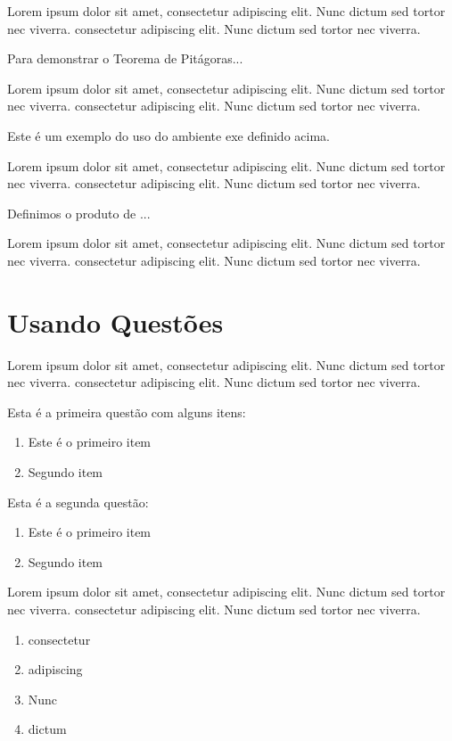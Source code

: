 Lorem ipsum dolor sit amet, consectetur adipiscing elit. Nunc dictum sed tortor nec viverra. consectetur adipiscing elit. Nunc dictum sed tortor nec viverra.

\begin{prop}
	Para demonstrar o Teorema de Pitágoras...
\end{prop}

Lorem ipsum dolor sit amet, consectetur adipiscing elit. Nunc dictum sed tortor nec viverra. consectetur adipiscing elit. Nunc dictum sed tortor nec viverra.

\begin{exem}
	Este é um exemplo do uso do ambiente exe definido acima.
\end{exem}

Lorem ipsum dolor sit amet, consectetur adipiscing elit. Nunc dictum sed tortor nec viverra. consectetur adipiscing elit. Nunc dictum sed tortor nec viverra.

\begin{xdefinicao}
	Definimos o produto de ...
\end{xdefinicao}

Lorem ipsum dolor sit amet, consectetur adipiscing elit. Nunc dictum sed tortor nec viverra. consectetur adipiscing elit. Nunc dictum sed tortor nec viverra.

\section{Usando Questões}

Lorem ipsum dolor sit amet, consectetur adipiscing elit. Nunc dictum sed tortor nec viverra. consectetur adipiscing elit. Nunc dictum sed tortor nec viverra.

\begin{questao}
	\item Esta é a primeira questão com alguns itens:
		\begin{enumerate}
			\item Este é o primeiro item
			\item Segundo item
		\end{enumerate}
	\item Esta é a segunda questão:
		\begin{enumerate}
			\item Este é o primeiro item
			\item Segundo item
		\end{enumerate}
	\item Lorem ipsum dolor sit amet, consectetur adipiscing elit. Nunc dictum sed tortor nec viverra. consectetur adipiscing elit. Nunc dictum sed tortor nec viverra.
		\begin{enumerate}
			\item consectetur
			\item adipiscing
			\item Nunc
			\item dictum
		\end{enumerate}
\end{questao}

